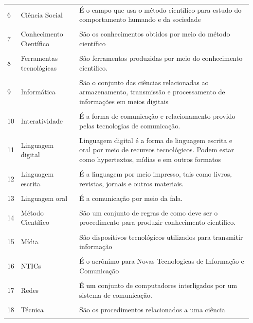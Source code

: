 \documentclass[a4paper, 12pt]{article}
\begin{document}
\begin{enumerate}
\begin{tabular}{|m{0.5cm}|m{5cm}|m{8cm}|}
      \hline
      6 & Ciência Social & É o campo que usa o método científico para estudo do comportamento humando e da sociedade \\ \\
      \hline
      7 & Conhecimento Científico & São os conhecimentos obtidos por meio do método científico \\ \\
      \hline
      8 & Ferramentas tecnológicas & São ferramentas produzidas por meio do conhecimento científico. \\ \\
      \hline
      9 & Informática & São o conjunto das ciências relacionadas ao armazenamento, transmissão e processamento de informações em meios digitais \\ \\
      \hline
      10 & Interatividade & É a forma de comunicação e relacionamento provido pelas tecnologias de comunicação. \\ \\
      \hline
      11 & Linguagem digital & Linguagem digital é a forma de linguagem escrita e oral por meio de recursos tecnológicos. Podem estar como hypertextos, mídias e em outros formatos  \\ \\
      \hline
      12 & Linguagem escrita & É a linguagem por meio impresso, tais como livros, revistas, jornais e outros materiais. \\ \\
      \hline
      13 & Linguagem oral & É a comunicação por meio da fala. \\ \\
      \hline
      14 & Método Científico & São um conjunto de regras de como deve ser o procedimento para produzir conhecimento científico.  \\ \\
      \hline
      15 & Mídia & São dispositivos tecnológicos utilizados para transmitir informação\\ \\
      \hline
      16 & NTICs & É o acrônimo para Novas Tecnologicas de Informação e Comunicação\\ \\
      \hline
      17 & Redes & É um conjunto de computadores interligados por um sistema de comunicação. \\ \\
      \hline
      18 & Técnica & São os procedimentos relacionados a uma ciência\\ \\

\end{tabular}
\end{enumerate}
\end{document}
